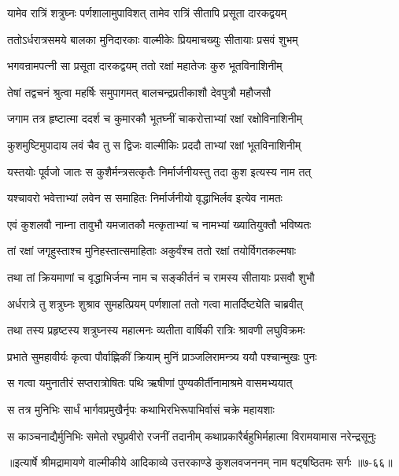 
\twolineshloka
{यामेव रात्रिं शत्रुघ्नः पर्णशालामुपाविशत्}
{तामेव रात्रिं सीतापि प्रसूता दारकद्वयम्} %

\twolineshloka
{ततोऽर्धरात्रसमये बालका मुनिदारकाः}
{वाल्मीकेः प्रियमाचख्युः सीतायाः प्रसवं शुभम्} %

\twolineshloka
{भगवन्रामपत्नी सा प्रसूता दारकद्वयम्}
{ततो रक्षां महातेजः कुरु भूतविनाशिनीम्} %

\twolineshloka
{तेषां तद्वचनं श्रुत्वा महर्षिः समुपागमत्}
{बालचन्द्रप्रतीकाशौ देवपुत्रौ महौजसौ} %

\twolineshloka
{जगाम तत्र हृष्टात्मा ददर्श च कुमारकौ}
{भूतघ्नीं चाकरोत्ताभ्यां रक्षां रक्षोविनाशिनीम्} %

\twolineshloka
{कुशमुष्टिमुपादाय लवं चैव तु स द्विजः}
{वाल्मीकिः प्रददौ ताभ्यां रक्षां भूतविनाशिनीम्} %

\twolineshloka
{यस्तयोः पूर्वजो जातः स कुशैर्मन्त्रसत्कृतैः}
{निर्मार्जनीयस्तु तदा कुश इत्यस्य नाम तत्} %

\twolineshloka
{यश्चावरो भवेत्ताभ्यां लवेन स समाहितः}
{निर्मार्जनीयो वृद्धाभिर्लव इत्येव नामतः} %

\twolineshloka
{एवं कुशलवौ नाम्ना तावुभौ यमजातकौ}
{मत्कृताभ्यां च नामभ्यां ख्यातियुक्तौ भविष्यतः} %

\twolineshloka
{तां रक्षां जगृहुस्ताश्च मुनिहस्तात्समाहिताः}
{अकुर्वंश्च ततो रक्षां तयोर्विगतकल्मषाः} %

\twolineshloka
{तथा तां क्रियमाणां च वृद्धाभिर्जन्म नाम च}
{सङ्कीर्तनं च रामस्य सीतायाः प्रसवौ शुभौ} %

\twolineshloka
{अर्धरात्रे तु शत्रुघ्नः शुश्राव सुमहत्प्रियम्}
{पर्णशालां ततो गत्वा मातर्दिष्ट्येति चाब्रवीत्} %

\twolineshloka
{तथा तस्य प्रहृष्टस्य शत्रुघ्नस्य महात्मनः}
{व्यतीता वार्षिकी रात्रिः श्रावणी लघुविक्रमः} %

\twolineshloka
{प्रभाते सुमहावीर्यः कृत्वा पौर्वाह्णिकीं क्रियाम्}
{मुनिं प्राञ्जलिरामन्त्र्य ययौ पश्चान्मुखः पुनः} %

\twolineshloka
{स गत्वा यमुनातीरं सप्तरात्रोषितः पथि}
{ऋषीणां पुण्यकीर्तीनामाश्रमे वासमभ्ययात्} %

\twolineshloka
{स तत्र मुनिभिः सार्धं भार्गवप्रमुखैर्नृपः}
{कथाभिरभिरूपाभिर्वासं चक्रे महायशाः} %

\twolineshloka
{स काञ्चनाद्यैर्मुनिभिः समेतो रघुप्रवीरो रजनीं तदानीम्}
{कथाप्रकारैर्बहुभिर्महात्मा विरामयामास नरेन्द्रसूनुः} %


॥इत्यार्षे श्रीमद्रामायणे वाल्मीकीये आदिकाव्ये उत्तरकाण्डे कुशलवजननम् नाम षट्षष्ठितमः सर्गः ॥७-६६॥
